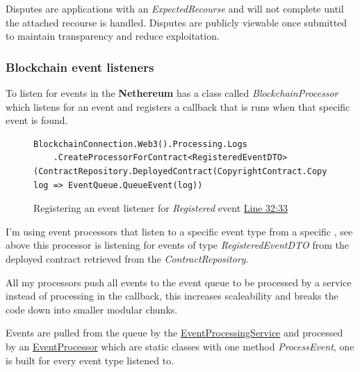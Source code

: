 Disputes are applications with an \textit{ExpectedRecourse} and will not complete until the attached recourse is handled. Disputes are publicly viewable once submitted to maintain transparency and reduce exploitation. 

\subsubsection{Blockchain event listeners}
\label{sec:blockchain-event-listeners}

To listen for events in the  \textbf{Nethereum} has a class called \textit{BlockchainProcessor} which listens for an event and registers a callback that is runs when that specific event is found.

\begin{figure}[H]
\caption{Registering an event listener for \textit{Registered} event \href{https://github.com/MrHarrisonBarker/CRPL/blob/main/CRPL.Web/Services/Background/BlockchainEventListener.cs}{Line 32:33}}
\centering
\begin{lstlisting}[language=CSharp]
BlockchainConnection.Web3().Processing.Logs
	.CreateProcessorForContract<RegisteredEventDTO>(ContractRepository.DeployedContract(CopyrightContract.Copyright).Address, log => EventQueue.QueueEvent(log))
\end{lstlisting}
\end{figure}

I'm using event processors that listen to a specific event type from a specific , see above this processor is listening for events of type \textit{RegisteredEventDTO} from the deployed contract retrieved from the \textit{ContractRepository}.

All my processors push all events to the event queue to be processed by a service instead of processing in the callback, this increases scaleability and breaks the code down into smaller modular chunks.

Events are pulled from the queue by the \href{https://github.com/MrHarrisonBarker/CRPL/blob/main/CRPL.Web/Services/Background/EventProcessingService.cs}{EventProcessingService} and processed by an \href{https://github.com/MrHarrisonBarker/CRPL/tree/main/CRPL.Web/Core/EventProcessors}{EventProcessor} which are static classes with one method \textit{ProcessEvent}, one is built for every event type listened to. 

